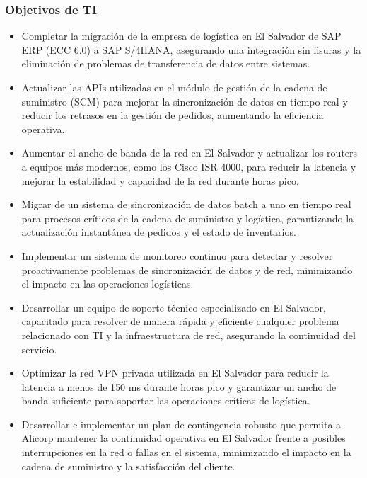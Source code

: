     \subsubsection{Objetivos de TI}
        \begin{itemize}
            \item Completar la migración de la empresa de logística en El Salvador de SAP ERP (ECC 6.0) a SAP S/4HANA, asegurando una integración sin fisuras y la eliminación de problemas de transferencia de datos entre sistemas. 
            \item Actualizar las APIs utilizadas en el módulo de gestión de la cadena de suministro (SCM) para mejorar la sincronización de datos en tiempo real y reducir los retrasos en la gestión de pedidos, aumentando la eficiencia operativa. 
            \item Aumentar el ancho de banda de la red en El Salvador y actualizar los routers a equipos más modernos, como los Cisco ISR 4000, para reducir la latencia y mejorar la estabilidad y capacidad de la red durante horas pico. 
            \item Migrar de un sistema de sincronización de datos batch a uno en tiempo real para procesos críticos de la cadena de suministro y logística, garantizando la actualización instantánea de pedidos y el estado de inventarios. 
            \item Implementar un sistema de monitoreo continuo para detectar y resolver proactivamente problemas de sincronización de datos y de red, minimizando el impacto en las operaciones logísticas. 
            \item Desarrollar un equipo de soporte técnico especializado en El Salvador, capacitado para resolver de manera rápida y eficiente cualquier problema relacionado con TI y la infraestructura de red, asegurando la continuidad del servicio. 
            \item Optimizar la red VPN privada utilizada en El Salvador para reducir la latencia a menos de 150 ms durante horas pico y garantizar un ancho de banda suficiente para soportar las operaciones críticas de logística. 
            \item Desarrollar e implementar un plan de contingencia robusto que permita a Alicorp mantener la continuidad operativa en El Salvador frente a posibles interrupciones en la red o fallas en el sistema, minimizando el impacto en la cadena de suministro y la satisfacción del cliente.
        \end{itemize}
    
